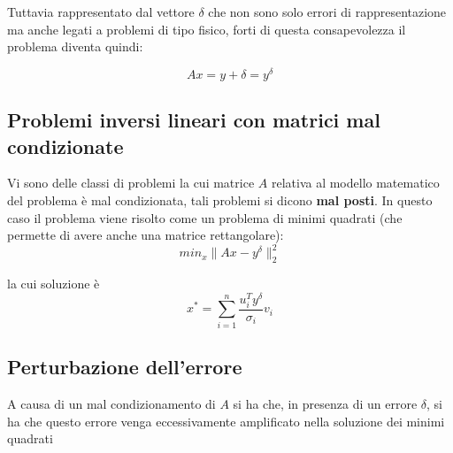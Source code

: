 Tuttavia  rappresentato dal vettore $\delta$ che non sono solo errori di rappresentazione ma anche legati a problemi di tipo fisico, forti di questa consapevolezza il problema diventa quindi:

\[
    Ax = y+\delta = y^\delta    
\]

\subsection{Problemi inversi lineari con matrici mal condizionate}

Vi sono delle classi di problemi la cui matrice $A$ relativa al modello matematico del problema è mal condizionata, tali problemi si dicono \textbf{mal posti}. In questo caso il problema viene risolto come un problema di minimi quadrati (che permette di avere anche una matrice rettangolare):
\[
    min_x\|Ax - y^\delta\|_2^2
\]

la cui soluzione è
\[
    x^*=\sum_{i=1}^{n} \frac{u^T_iy^\delta}{\sigma_i}v_i    
\]

\subsection{Perturbazione dell'errore}

A causa di un mal condizionamento di $A$ si ha che, in presenza di un errore  $\delta$, si ha che questo errore venga eccessivamente amplificato nella soluzione dei minimi quadrati

